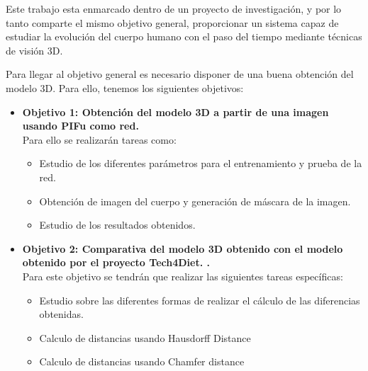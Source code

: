
Este trabajo esta enmarcado dentro de un proyecto de investigación, y por lo tanto comparte el mismo objetivo general, proporcionar un sistema capaz de estudiar la evolución del cuerpo humano con el paso del tiempo mediante técnicas de visión 3D. 

Para llegar al objetivo general es necesario disponer de una buena obtención del modelo 3D. Para ello, tenemos los siguientes objetivos:


\begin{itemize}
	\item{\textbf{Objetivo 1: Obtención del modelo 3D a partir de una imagen usando PIFu como red.}} 
	\\Para ello se realizarán tareas como:
	\begin{itemize}
		\item Estudio de los diferentes parámetros para el entrenamiento y prueba de la red.
		\item Obtención de imagen del cuerpo y generación de máscara de la imagen.
		\item Estudio de los resultados obtenidos.
		
		
	\end{itemize}
	\item{\textbf{Objetivo 2: Comparativa del modelo 3D obtenido con el modelo obtenido por el proyecto Tech4Diet. 
			.}} \\
	Para este objetivo se tendrán que realizar las siguientes tareas específicas:
	\begin{itemize}
		\item Estudio sobre las diferentes formas de realizar el cálculo de las diferencias obtenidas.
		\item Calculo de distancias usando Hausdorff Distance
		\item Calculo de distancias usando Chamfer distance
	\end{itemize}
\end{itemize}

\label{sec:Introducción}

